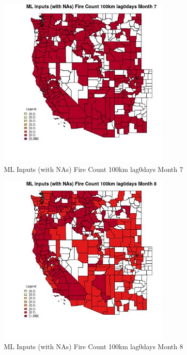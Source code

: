 \clearpage 

\begin{figure} 
\centering  
\includegraphics[width=0.77\textwidth]{Code_Outputs/Report_ML_input_PM25_Step4_part_e_de_duplicated_aves_compiled_2019-05-20wNAs_CountyFire_Count_100km_lag0daysmedianMonth7.jpg} 
\caption{\label{fig:Report_ML_input_PM25_Step4_part_e_de_duplicated_aves_compiled_2019-05-20wNAsCountyFire_Count_100km_lag0daysmedianMonth7}ML Inputs (with NAs) Fire Count 100km lag0days Month 7} 
\end{figure} 
 

\begin{figure} 
\centering  
\includegraphics[width=0.77\textwidth]{Code_Outputs/Report_ML_input_PM25_Step4_part_e_de_duplicated_aves_compiled_2019-05-20wNAs_CountyFire_Count_100km_lag0daysmedianMonth8.jpg} 
\caption{\label{fig:Report_ML_input_PM25_Step4_part_e_de_duplicated_aves_compiled_2019-05-20wNAsCountyFire_Count_100km_lag0daysmedianMonth8}ML Inputs (with NAs) Fire Count 100km lag0days Month 8} 
\end{figure} 
 

